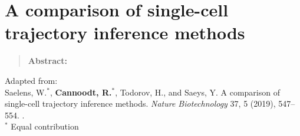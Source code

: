 \newpage{\thispagestyle{empty}\cleardoublepage}
\chapter{A comparison of single-cell trajectory inference methods} 
\label{chap:dynbenchmark}

\begin{quote}
	\textbf{Abstract:} \blindtext
\end{quote}

\vfill

Adapted from:\\
Saelens, W.$^*$, \textbf{Cannoodt, R.}$^*$, Todorov, H., and Saeys, Y. A comparison of single-cell trajectory inference methods. \textit{Nature Biotechnology} 37, 5 (2019), 547--554. .\\
{\footnotesize $^*$ Equal contribution}
\newpage

\blindtext

